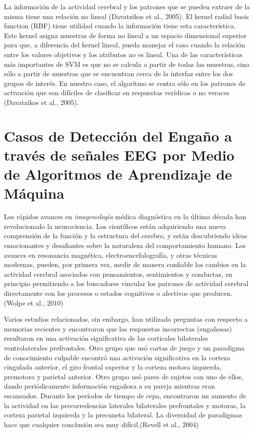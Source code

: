 La información de la actividad cerebral y los patrones que se pueden extraer de la misma tiene una relación no lineal (Davatzikos et al., 2005). El kernel radial basis function (RBF) tiene utilidad cuando la información tiene esta característica. Este kernel asigna muestras de forma no lineal a un espacio dimensional superior para que, a diferencia del kernel lineal, pueda manejar el caso cuando la relación entre los valores objetivos y los atributos no es lineal. Una de las características más importantes de SVM es que no se calcula a partir de todas las muestras, sino sólo a partir de muestras que se encuentran cerca de la interfaz entre los dos grupos de interés. En nuestro caso, el algoritmo se centra sólo en los patrones de activación que son difíciles de clasificar en respuestas verídicas o no veraces (Davatzikos et al., 2005).

\section{Casos de Detección del Engaño a través de señales EEG por Medio de Algoritmos de Aprendizaje de Máquina}
Los rápidos avances en \textit{imagenología} médica diagnóstica en la última década han revolucionado la neurociencia. Los científicos están adquiriendo una nueva comprensión de la función y la estructura del cerebro, y están descubriendo ideas emocionantes y desafiantes sobre la naturaleza del comportamiento humano. Los avances en resonancia magnética, electroencefalografía, y otras técnicas modernas, pueden, por primera vez, medir de manera confiable los cambios en la actividad cerebral asociados con pensamientos, sentimientos y conductas, en principio permitiendo a los buscadores vincular los patrones de actividad cerebral directamente con los procesos o estados cognitivos o afectivos que producen. (Wolpe et al., 2010)

Varios estudios relacionados, sin embargo, han utilizado preguntas con respecto a memorias recientes y encontraron que las respuestas incorrectas (engañosas) resultaron en una activación significativa de las corticales bilaterales ventrolaterales prefrontales. Otro grupo que usó cartas de juego y un paradigma de conocimiento culpable encontró una activación significativa en la corteza cingulada anterior, el giro frontal superior y la corteza motora izquierda, premotora y parietal anterior. Otro grupo usó pares de sujetos con uno de ellos, dando periódicamente información engañosa a su pareja mientras eran escaneados. Durante los períodos de tiempo de cepa, encontraron un aumento de la actividad en las precorredencias laterales bilaterales prefrontales y motoras, la corteza parietal izquierda y la precuneta bilateral. La diversidad de paradigmas hace que cualquier conclusión sea muy difícil.(Revell et al., 2004)

